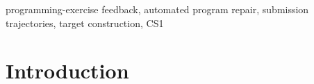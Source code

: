 \documentclass[10pt,conference]{IEEEtran}
\begin{document}
\begin{abstract}
\end{abstract}
\begin{IEEEkeywords}
programming-exercise feedback, automated program repair, submission trajectories, target construction, CS1
\end{IEEEkeywords}

\section{Introduction}
\label{sec:introduction}
\end{document}
